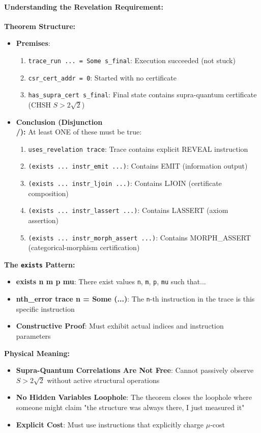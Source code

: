 \paragraph{Understanding the Revelation Requirement:}
\textbf{Theorem Structure:}
\begin{itemize}
    \item \textbf{Premises}:
    \begin{enumerate}
        \item \texttt{trace\_run ... = Some s\_final}: Execution succeeded (not stuck)
        \item \texttt{csr\_cert\_addr = 0}: Started with no certificate
        \item \texttt{has\_supra\_cert s\_final}: Final state contains supra-quantum certificate (CHSH $S > 2\sqrt{2}$)
    \end{enumerate}
    \item \textbf{Conclusion (Disjunction \\/):} At least ONE of these must be true:
    \begin{enumerate}
        \item \texttt{uses\_revelation trace}: Trace contains explicit REVEAL instruction
        \item \texttt{(exists ... instr\_emit ...)}: Contains EMIT (information output)
        \item \texttt{(exists ... instr\_ljoin ...)}: Contains LJOIN (certificate composition)
        \item \texttt{(exists ... instr\_lassert ...)}: Contains LASSERT (axiom assertion)
        \item \texttt{(exists ... instr\_morph\_assert ...)}: Contains MORPH\_ASSERT (categorical-morphism certification)
    \end{enumerate}
\end{itemize}

\textbf{The \texttt{exists} Pattern:}
\begin{itemize}
    \item \textbf{exists n m p mu}: There exist values \texttt{n}, \texttt{m}, \texttt{p}, \texttt{mu} such that...
    \item \textbf{nth\_error trace n = Some (...)}: The \texttt{n}-th instruction in the trace is this specific instruction
    \item \textbf{Constructive Proof}: Must exhibit actual indices and instruction parameters
\end{itemize}

\textbf{Physical Meaning:}
\begin{itemize}
    \item \textbf{Supra-Quantum Correlations Are Not Free}: Cannot passively observe $S > 2\sqrt{2}$ without active structural operations
    \item \textbf{No Hidden Variables Loophole}: The theorem closes the loophole where someone might claim "the structure was always there, I just measured it"
    \item \textbf{Explicit Cost}: Must use instructions that explicitly charge $\mu$-cost
\end{itemize}

